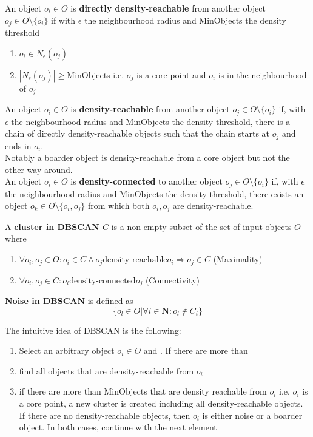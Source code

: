 An object $o_i \in O$ is \textbf{directly density-reachable} from another object $o_j \in O\setminus \{o_i\}$ if with $\epsilon$ the neighbourhood radius and MinObjects the density threshold
\begin{enumerate}
    \item $o_i \in N_\epsilon (o_j)$
    \item $|N_\epsilon(o_j)| \geq $MinObjects i.e. $o_j$ is a core point and $o_i$ is in the neighbourhood of $o_j$
\end{enumerate}

An object $o_i \in O$ is \textbf{density-reachable} from another object $o_j \in O\setminus \{o_i\}$ if, with $\epsilon$ the neighbourhood radius and MinObjects the density threshold, there is a chain of directly density-reachable objects such that the chain starts at $o_j$ and ends in $o_i$. \\
Notably a boarder object is density-reachable from a core object but not the other way around. \\

An object $o_i \in O$ is \textbf{density-connected} to another object $o_j \in O\setminus \{o_i\}$ if, with $\epsilon$ the neighbourhood radius and MinObjects the density threshold, there exists an object $o_k \in O\setminus \{o_i, o_j\}$ from which both $o_i, o_j$ are density-reachable.

A \textbf{cluster in DBSCAN $C$} is a non-empty subset of the set of input objects $O$ where 
\begin{enumerate}
    \item $\forall o_i, o_j \in O: o_i \in C \wedge o_j \text{density-reachable} o_i \Rightarrow o_j \in C$ (Maximality)
    \item $\forall o_i, o_j \in C: o_i \text{density-connected} o_j$ (Connectivity)
\end{enumerate}

\textbf{Noise in DBSCAN} is defined as \[ \{o_l \in O | \forall i \in \mathbf{N}: o_l \not \in C_i \}\]


The intuitive idea of DBSCAN is the following:
\begin{enumerate}
    \item Select an arbitrary object $o_i \in O$ and . If there are more than 
    \item find all objects that are density-reachable from $o_i$
    \item if there are more than MinObjects that are density reachable from $o_i$ i.e. $o_i$ is a core point, a new cluster is created including all density-reachable objects. If there are no density-reachable objects, then $o_i$ is either noise or a boarder object. In both cases, continue with the next element
\end{enumerate}


